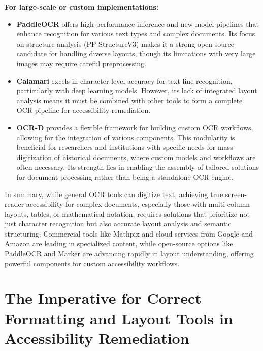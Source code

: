 \textbf{For large-scale or custom implementations:}
\begin{itemize}
    \item \textbf{PaddleOCR} offers high-performance inference and new model pipelines that enhance recognition for various text types and complex documents. Its focus on structure analysis (PP-StructureV3) makes it a strong open-source candidate for handling diverse layouts, though its limitations with very large images may require careful preprocessing.
    \item \textbf{Calamari} excels in character-level accuracy for text line recognition, particularly with deep learning models. However, its lack of integrated layout analysis means it must be combined with other tools to form a complete OCR pipeline for accessibility remediation.
    \item \textbf{OCR-D} provides a flexible framework for building custom OCR workflows, allowing for the integration of various components. This modularity is beneficial for researchers and institutions with specific needs for mass digitization of historical documents, where custom models and workflows are often necessary. Its strength lies in enabling the assembly of tailored solutions for document processing rather than being a standalone OCR engine.
\end{itemize}

In summary, while general OCR tools can digitize text, achieving true screen-reader accessibility for complex documents, especially those with multi-column layouts, tables, or mathematical notation, requires solutions that prioritize not just character recognition but also accurate layout analysis and semantic structuring. Commercial tools like Mathpix and cloud services from Google and Amazon are leading in specialized content, while open-source options like PaddleOCR and Marker are advancing rapidly in layout understanding, offering powerful components for custom accessibility workflows.

\section{The Imperative for Correct Formatting and Layout Tools in Accessibility Remediation}

